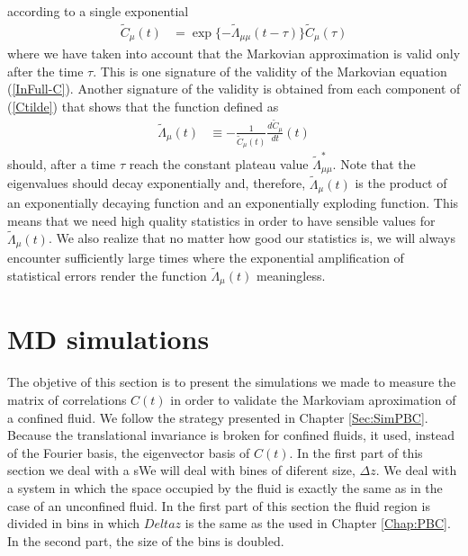 \documentclass[a4paper,openright,12pt]{book}
\begin{document}
according to a single exponential
\begin{align}
  \tilde{C}_\mu(t)&=\exp\{-\tilde{\Lambda}_{\mu\mu} (t-\tau)\}  \tilde{C}_\mu(\tau)
\end{align}
where we have  taken into account that the  Markovian approximation is
valid only after the time $\tau$. This is one signature of the validity of the
Markovian equation (\ref{InFull-C}). Another signature of the validity is obtained from
each component of (\ref{Ctilde}) that shows that the function defined
as
\begin{align}
  \tilde{\Lambda}_{\mu}(t)&\equiv -\frac{1}{{\tilde{C}}_{\mu}(t)}\frac{d{\tilde{C}}_{\mu}}{dt}(t)
\label{LambdatRec}
\end{align}
should,  after  a time  $\tau$  reach  the  constant plateau  value  $
\tilde{\Lambda}_{\mu\mu}^*$.  Note  that the eigenvalues  should decay
exponentially  and,  therefore,  $  \tilde{\Lambda}_{\mu}(t)$  is  the
product  of an  exponentially decaying  function and  an exponentially
exploding function. This means that we need high quality statistics in
order  to have  sensible values  for $  \tilde{\Lambda}_{\mu}(t)$.  We
also realize that no matter how good our statistics is, we will always
encounter sufficiently large times where the exponential amplification
of statistical errors render  the function $ \tilde{\Lambda}_{\mu}(t)$
meaningless.

\section{MD simulations}
\label{Sec:SimWALLS}
The objetive of this section is to present the simulations we made to measure the matrix of correlations $C(t)$ in order to validate the Markoviam aproximation of a confined fluid. 
We follow the strategy presented in Chapter \ref{Sec:SimPBC}. Because the translational invariance is broken for confined fluids, it used, instead of the Fourier basis, the eigenvector basis of $C(t)$. 
In the first part of this section we deal with a sWe will deal with bines of diferent size, $\Delta z$.  
We deal with a system in which the space occupied by the fluid is exactly the same as in the case of an unconfined fluid. In the first part of this section the fluid region is divided in bins in which $Delta z$ is the same as the used in Chapter \ref{Chap:PBC}. In the second part, the size of the bins is doubled. 
\end{document}
